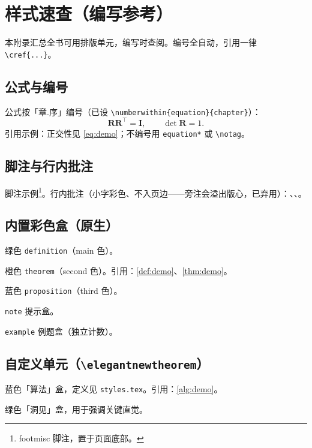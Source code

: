 \chapter{样式速查（编写参考）}
\label{ch:gallery}

本附录汇总全书可用排版单元，编写时查阅。编号全自动，引用一律 \verb|\cref{...}|。

\section{公式与编号}
公式按「章.序」编号（已设 \verb|\numberwithin{equation}{chapter}|）：
\begin{equation}\label{eq:demo}
  \mathbf{R}\mathbf{R}^\top=\mathbf{I},\qquad \det\mathbf{R}=1 .
\end{equation}
引用示例：正交性见 \cref{eq:demo}；不编号用 \verb|equation*| 或 \verb|\notag|。

\section{脚注与行内批注}
脚注示例\footnote{footmisc 脚注，置于页面底部。}。行内批注（小字彩色、不入页边——旁注会溢出版心，已弃用）：、、。

\section{内置彩色盒（原生）}
\begin{definition}[特殊正交群]\label{def:demo}
  绿色 \texttt{definition}（main 色）。
\end{definition}
\begin{theorem}[指数映射]\label{thm:demo}
  橙色 \texttt{theorem}（second 色）。引用：\cref{def:demo}、\cref{thm:demo}。
\end{theorem}
\begin{proposition}
  蓝色 \texttt{proposition}（third 色）。
\end{proposition}
\begin{note}
  \texttt{note} 提示盒。
\end{note}
\begin{example}
  \texttt{example} 例题盒（独立计数）。
\end{example}

\section{自定义单元（\texttt{\textbackslash elegantnewtheorem}）}
\begin{algo}[ESKF 预测]\label{alg:demo}
  蓝色「算法」盒，定义见 \verb|styles.tex|。引用：\cref{alg:demo}。
\end{algo}
\begin{insight}
  绿色「洞见」盒，用于强调关键直觉。
\end{insight}

